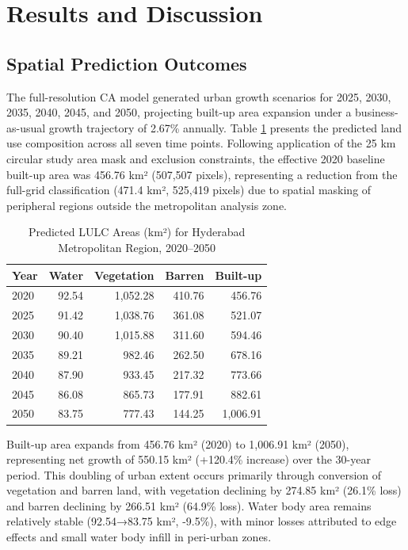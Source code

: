 \documentclass[12pt,a4paper]{article}
\begin{document}
\section{Results and Discussion}

\subsection{Spatial Prediction Outcomes}

The full-resolution CA model generated urban growth scenarios for 2025, 2030, 2035, 2040, 2045, and 2050, projecting built-up area expansion under a business-as-usual growth trajectory of 2.67\% annually. Table \ref{tab:spatial_results} presents the predicted land use composition across all seven time points. Following application of the 25 km circular study area mask and exclusion constraints, the effective 2020 baseline built-up area was 456.76 km² (507,507 pixels), representing a reduction from the full-grid classification (471.4 km², 525,419 pixels) due to spatial masking of peripheral regions outside the metropolitan analysis zone.

\begin{table}[H]
\caption{Predicted LULC Areas (km²) for Hyderabad Metropolitan Region, 2020--2050}
\label{tab:spatial_results}
\centering
\small
\renewcommand{\arraystretch}{1.2}
\begin{tabular}{lrrrr}
\toprule
\textbf{Year} & \textbf{Water} & \textbf{Vegetation} & \textbf{Barren} & \textbf{Built-up} \\
\midrule
2020 & 92.54 & 1,052.28 & 410.76 & 456.76 \\
2025 & 91.42 & 1,038.76 & 361.08 & 521.07 \\
2030 & 90.40 & 1,015.88 & 311.60 & 594.46 \\
2035 & 89.21 & 982.46 & 262.50 & 678.16 \\
2040 & 87.90 & 933.45 & 217.32 & 773.66 \\
2045 & 86.08 & 865.73 & 177.91 & 882.61 \\
2050 & 83.75 & 777.43 & 144.25 & 1,006.91 \\
\bottomrule
\end{tabular}
\end{table}

Built-up area expands from 456.76 km² (2020) to 1,006.91 km² (2050), representing net growth of 550.15 km² (+120.4\% increase) over the 30-year period. This doubling of urban extent occurs primarily through conversion of vegetation and barren land, with vegetation declining by 274.85 km² (26.1\% loss) and barren declining by 266.51 km² (64.9\% loss). Water body area remains relatively stable (92.54→83.75 km², -9.5\%), with minor losses attributed to edge effects and small water body infill in peri-urban zones.
\end{document}
